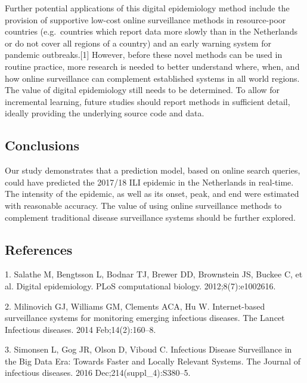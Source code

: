 \documentclass[]{article}
\begin{document}
Further potential applications of this digital epidemiology method
include the provision of supportive low-cost online surveillance methods
in resource-poor countries (e.g.~countries which report data more slowly
than in the Netherlands or do not cover all regions of a country) and an
early warning system for pandemic outbreaks.{[}1{]} However, before
these novel methods can be used in routine practice, more research is
needed to better understand where, when, and how online surveillance can
complement established systems in all world regions. The value of
digital epidemiology still needs to be determined. To allow for
incremental learning, future studies should report methods in sufficient
detail, ideally providing the underlying source code and data.

\hypertarget{conclusions}{%
\subsection{\texorpdfstring{\textbf{Conclusions}}{Conclusions}}\label{conclusions}}

Our study demonstrates that a prediction model, based on online search
queries, could have predicted the 2017/18 ILI epidemic in the
Netherlands in real-time. The intensity of the epidemic, as well as its
onset, peak, and end were estimated with reasonable accuracy. The value
of using online surveillance methods to complement traditional disease
surveillance systems should be further explored.

\hypertarget{references}{%
\subsection{\texorpdfstring{\textbf{References}}{References}}\label{references}}

\hypertarget{refs}{}
\leavevmode\hypertarget{ref-Salathe2012}{}%
1. Salathe M, Bengtsson L, Bodnar TJ, Brewer DD, Brownstein JS, Buckee
C, et al. Digital epidemiology. PLoS computational biology.
2012;8(7):e1002616.

\leavevmode\hypertarget{ref-Milinovich2014}{}%
2. Milinovich GJ, Williams GM, Clements ACA, Hu W. Internet-based
surveillance systems for monitoring emerging infectious diseases. The
Lancet Infectious diseases. 2014 Feb;14(2):160--8.

\leavevmode\hypertarget{ref-Simonsen2016}{}%
3. Simonsen L, Gog JR, Olson D, Viboud C. Infectious Disease
Surveillance in the Big Data Era: Towards Faster and Locally Relevant
Systems. The Journal of infectious diseases. 2016
Dec;214(suppl\_4):S380--5.
\end{document}
